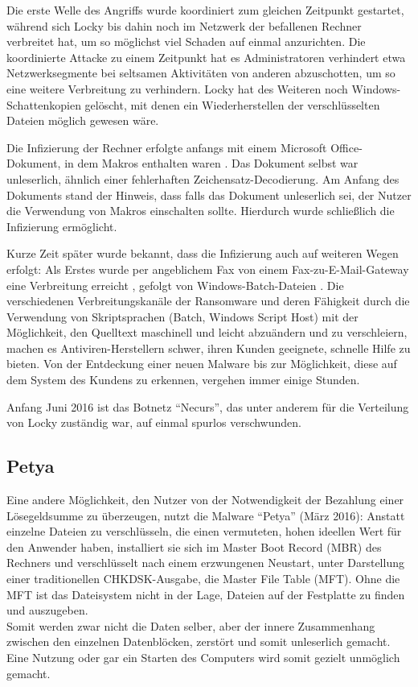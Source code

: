 Die erste Welle des Angriffs wurde koordiniert zum gleichen Zeitpunkt gestartet, während sich Locky bis dahin noch im Netzwerk der befallenen Rechner verbreitet hat, um so möglichst viel Schaden auf einmal anzurichten. Die koordinierte Attacke zu einem Zeitpunkt hat es Administratoren verhindert etwa Netzwerksegmente bei seltsamen Aktivitäten von anderen abzuschotten, um so eine weitere Verbreitung zu verhindern. Locky hat des Weiteren noch Windows-Schattenkopien gelöscht, mit denen ein Wiederherstellen der verschlüsselten Dateien möglich gewesen wäre.\dcn

Die Infizierung der Rechner erfolgte anfangs mit einem Microsoft Office-Dokument, in dem Makros enthalten waren \cite{locky:infection}. Das Dokument selbst war unleserlich, ähnlich einer fehlerhaften Zeichensatz-Decodierung. Am Anfang des Dokuments stand der Hinweis, dass falls das Dokument unleserlich sei, der Nutzer die Verwendung von Makros einschalten sollte. Hierdurch wurde schließlich die Infizierung ermöglicht.

Kurze Zeit später wurde bekannt, dass die Infizierung auch auf weiteren Wegen erfolgt: Als Erstes wurde per angeblichem Fax von einem Fax-zu-E-Mail-Gateway eine Verbreitung erreicht \cite{locky:fax}, gefolgt von Windows-Batch-Dateien \cite{locky:batch}. Die verschiedenen Verbreitungskanäle der Ransomware und deren Fähigkeit durch die Verwendung von Skriptsprachen (Batch, Windows Script Host) mit der Möglichkeit, den Quelltext maschinell und leicht abzuändern und zu verschleiern, machen es Antiviren-Herstellern schwer, ihren Kunden geeignete, schnelle Hilfe zu bieten. Von der Entdeckung einer neuen Malware bis zur Möglichkeit, diese auf dem System des Kundens zu erkennen, vergehen immer einige Stunden.\dcn

Anfang Juni 2016 ist das Botnetz ``Necurs'', das unter anderem für die Verteilung von Locky zuständig war, auf einmal spurlos verschwunden. \cite{locky:end}

		
\subsection{Petya}
Eine andere Möglichkeit, den Nutzer von der Notwendigkeit der Bezahlung einer Lösegeldsumme zu überzeugen, nutzt die Malware ``Petya'' (März 2016): Anstatt einzelne Dateien zu verschlüsseln, die einen vermuteten, hohen ideellen Wert für den Anwender haben, installiert sie sich im Master Boot Record (MBR) des Rechners und verschlüsselt nach einem erzwungenen Neustart, unter Darstellung einer traditionellen CHKDSK-Ausgabe, die Master File Table (MFT). Ohne die MFT ist das Dateisystem nicht in der Lage, Dateien auf der Festplatte zu finden und auszugeben. \cite{petya:start} \\
Somit werden zwar nicht die Daten selber, aber der innere Zusammenhang zwischen den einzelnen Datenblöcken, zerstört und somit unleserlich gemacht. Eine Nutzung oder gar ein Starten des Computers wird somit gezielt unmöglich gemacht.


